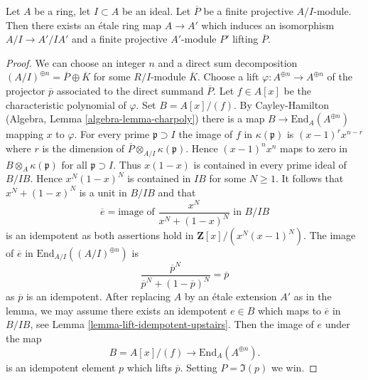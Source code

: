 \begin{lemma}
\label{lemma-lift-projective-module}
Let $A$ be a ring, let $I \subset A$ be an ideal.
Let $\overline{P}$ be a finite projective $A/I$-module.
Then there exists an \'etale ring map $A \to A'$ which induces
an isomorphism $A/I \to A'/IA'$ and a finite projective
$A'$-module $P'$ lifting $\overline{P}$.
\end{lemma}

\begin{proof}
We can choose an integer $n$ and a direct sum decomposition
$(A/I)^{\oplus n} = \overline{P} \oplus \overline{K}$
for some $R/I$-module $\overline{K}$. Choose a lift
$\varphi : A^{\oplus n} \to A^{\oplus n}$ of the projector $\overline{p}$
associated to the direct summand $\overline{P}$.
Let $f \in A[x]$ be the characteristic polynomial of $\varphi$.
Set $B = A[x]/(f)$. By Cayley-Hamilton
(Algebra, Lemma \ref{algebra-lemma-charpoly}) there is a map
$B \to \text{End}_A(A^{\oplus n})$ mapping $x$ to $\varphi$.
For every prime $\mathfrak p \supset I$ the image of $f$ in
$\kappa(\mathfrak p)$ is $(x - 1)^rx^{n - r}$ where $r$ is the
dimension of $\overline{P} \otimes_{A/I} \kappa(\mathfrak p)$.
Hence $(x - 1)^nx^n$ maps to zero in $B \otimes_A \kappa(\mathfrak p)$
for all $\mathfrak p \supset I$. Thus $x(1 - x)$ is contained
in every prime ideal of $B/IB$. Hence $x^N(1 - x)^N$ is
contained in $IB$ for some $N \geq 1$.
It follows that $x^N + (1 - x)^N$ is a unit in $B/IB$ and that
$$
\overline{e} = \text{image of }\frac{x^N}{x^N + (1 - x)^N}\text{ in }B/IB
$$
is an idempotent as both assertions hold in $\mathbf{Z}[x]/(x^N(x - 1)^N)$.
The image of $\overline{e}$ in $\text{End}_{A/I}((A/I)^{\oplus n})$ is
$$
\frac{\overline{p}^N}{\overline{p}^N + (1 - \overline{p})^N} = \overline{p}
$$
as $\overline{p}$ is an idempotent. After replacing $A$ by an \'etale
extension $A'$ as in the lemma, we may assume there exists an idempotent
$e \in B$ which maps to $\overline{e}$ in $B/IB$, see
Lemma \ref{lemma-lift-idempotent-upstairs}.
Then the image of $e$ under the map
$$
B = A[x]/(f) \longrightarrow \text{End}_A(A^{\oplus n}).
$$
is an idempotent element $p$ which lifts $\overline{p}$.
Setting $P = \Im(p)$ we win.
\end{proof}
